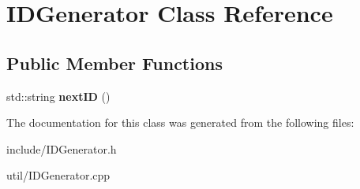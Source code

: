 \hypertarget{classIDGenerator}{}\section{I\+D\+Generator Class Reference}
\label{classIDGenerator}
\subsection*{Public Member Functions}
\begin{DoxyCompactItemize}
\item 
std\+::string {\bfseries next\+ID} ()\hypertarget{classIDGenerator_a223bf057a0ad9e69df527142dfe1e91b}{}\label{classIDGenerator_a223bf057a0ad9e69df527142dfe1e91b}

\end{DoxyCompactItemize}


The documentation for this class was generated from the following files\+:\begin{DoxyCompactItemize}
\item 
include/I\+D\+Generator.\+h\item 
util/I\+D\+Generator.\+cpp\end{DoxyCompactItemize}
